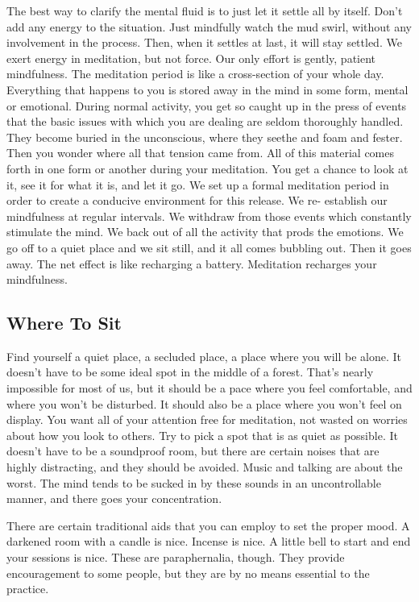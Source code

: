 The best way to clarify the mental fluid is to just let it settle all by itself.
Don't add any energy to the situation. Just mindfully watch the mud swirl,
without any involvement in the process. Then, when it settles at last, it will
stay settled. We exert energy in meditation, but not force. Our only effort is
gently, patient mindfulness.  The meditation period is like a cross-section of
your whole day. Everything that happens to you is stored away in the mind in
some form, mental or emotional. During normal activity, you get so caught up in
the press of events that the basic issues with which you are dealing are seldom
thoroughly handled. They become buried in the unconscious, where they seethe and
foam and fester. Then you wonder where all that tension came from. All of this
material comes forth in one form or another during your meditation. You get a
chance to look at it, see it for what it is, and let it go. We set up a formal
meditation period in order to create a conducive environment for this release.
We re- establish our mindfulness at regular intervals. We withdraw from those
events which constantly stimulate the mind. We back out of all the activity that
prods the emotions. We go off to a quiet place and we sit still, and it all
comes bubbling out. Then it goes away. The net effect is like recharging a
battery. Meditation recharges your mindfulness.

\subsection*{Where To Sit}
Find yourself a quiet place, a secluded place, a place where you
will be alone. It doesn't have to be some ideal spot in the middle of a forest.
That's nearly impossible for most of us, but it should be a pace where you feel
comfortable, and where you won't be disturbed. It should also be a place where
you won't feel on display. You want all of your attention free for meditation,
not wasted on worries about how you look to others. Try to pick a spot that is
as quiet as possible. It doesn't have to be a soundproof room, but there are
certain noises that are highly distracting, and they should be avoided. Music
and talking are about the worst. The mind tends to be sucked in by these sounds
in an uncontrollable manner, and there goes your concentration.

There are certain traditional aids that you can employ to set the proper mood. A
darkened room with a candle is nice. Incense is nice. A little bell to start and
end your sessions is nice. These are paraphernalia, though. They provide
encouragement to some people, but they are by no means essential to the
practice.

